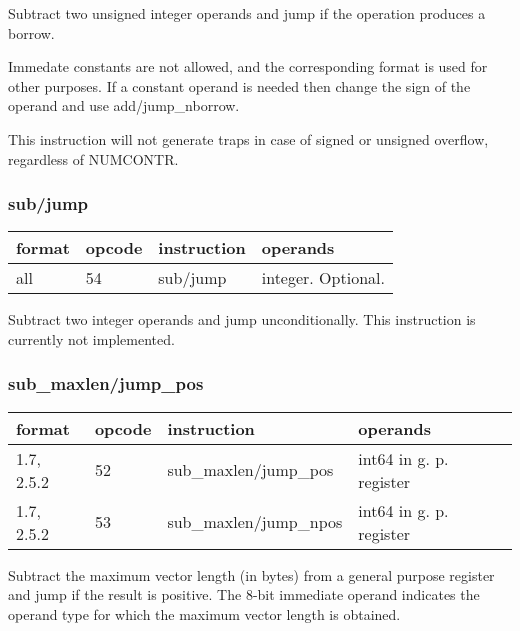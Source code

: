 \documentclass[forwardcom.tex]{subfiles}
\begin{document}
Subtract two unsigned integer operands and jump if the operation produces a borrow.
\vspace{2mm}

Immedate constants are not allowed, and the corresponding format is used for other purposes.
If a constant operand is needed then change the sign of the operand and use add/jump\_nborrow. 
\vspace{2mm}

This instruction will not generate traps in case of signed or unsigned overflow, regardless of  NUMCONTR.
\vspace{2mm}

\subsubsection{sub/jump}
\label{table:subJumpInstruction}
\begin{tabular}{|p{16mm}|p{12mm}|p{60mm}|p{50mm}|}
\hline
\bfseries format & \bfseries opcode & \bfseries instruction & \bfseries operands \\ \hline
all & 54 & sub/jump & integer. Optional. \\ \hline
\end{tabular}
\vspace{2mm}

Subtract two integer operands and jump unconditionally. This instruction is currently not implemented.
\vspace{2mm}

\subsubsection{sub\_maxlen/jump\_pos}
\label{table:subMaxlenJumpPosInstruction}
\begin{tabular}{|p{16mm}|p{12mm}|p{60mm}|p{50mm}|}
\hline
\bfseries format & \bfseries opcode & \bfseries instruction & \bfseries operands \\ \hline
1.7, 2.5.2 & 52 & sub\_maxlen/jump\_pos & int64 in g. p. register \\ \hline
1.7, 2.5.2 & 53 & sub\_maxlen/jump\_npos & int64 in g. p. register \\ \hline
\end{tabular}
\vspace{2mm}

Subtract the maximum vector length (in bytes) from a general purpose register and jump if the result is positive.
The 8-bit immediate operand indicates the operand type for which the maximum vector length is obtained.
\vspace{2mm}
\end{document}
